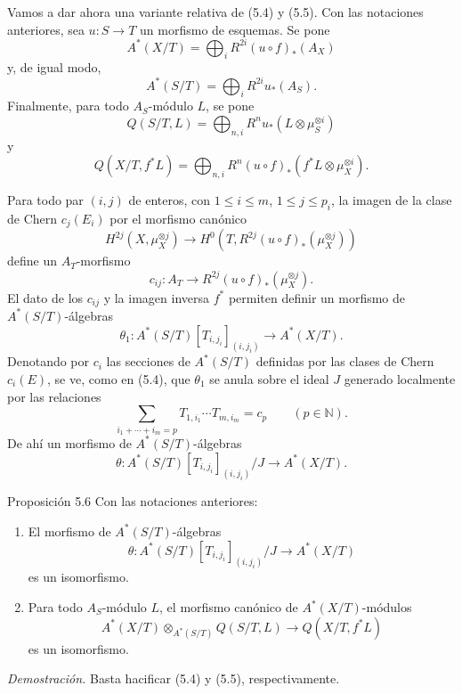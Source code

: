 Vamos a dar ahora una variante relativa de (5.4) y (5.5). Con las notaciones anteriores, sea $u:S\to T$ un morfismo de esquemas. Se pone
\[
A^*(X/T)=\bigoplus_i R^{2i}(u\circ f)_*(A_X)
\]
y, de igual modo,
\[
A^*(S/T)=\bigoplus_i R^{2i}u_*(A_S).
\]
Finalmente, para todo $A_S$-módulo $L$, se pone
\[
Q(S/T,L)=\bigoplus_{n,i}R^n u_*(L\otimes\mu_S^{\otimes i})
\]
y
\[
Q(X/T,f^*L)=\bigoplus_{n,i}R^n(u\circ f)_*(f^*L\otimes\mu_X^{\otimes i}).
\]

Para todo par $(i,j)$ de enteros, con $1\le i\le m$, $1\le j\le p_i$, la imagen de la clase de Chern $c_j(E_i)$ por el morfismo canónico
\[
H^{2j}(X,\mu_X^{\otimes j})
\to H^0(T,R^{2j}(u\circ f)_*(\mu_X^{\otimes j}))
\]
define un $A_T$-morfismo
\[
c_{ij}:A_T\to R^{2j}(u\circ f)_*(\mu_X^{\otimes j}).
\]
El dato de los $c_{ij}$ y la imagen inversa $f^*$ permiten definir un morfismo de $A^*(S/T)$-álgebras
\[
\theta_1:A^*(S/T)[T_{i,j_i}]_{(i,j_i)}\to A^*(X/T).
\]
Denotando por $c_i$ las secciones de $A^*(S/T)$ definidas por las clases de Chern $c_i(E)$, se ve, como en (5.4), que $\theta_1$ se anula sobre el ideal $J$ generado localmente por las relaciones
\[
\sum_{i_1+\cdots+i_m=p}T_{1,i_1}\cdots T_{m,i_m}=c_p\qquad(p\in\mathbb N).
\]
De ahí un morfismo de $A^*(S/T)$-álgebras
\[
\theta:A^*(S/T)[T_{i,j_i}]_{(i,j_i)}/J\to A^*(X/T).
\]

\begin{statement}{Proposición 5.6}
Con las notaciones anteriores:
\begin{enumerate}[label=\alph*)]
\item El morfismo de $A^*(S/T)$-álgebras
\[
\theta:A^*(S/T)[T_{i,j_i}]_{(i,j_i)}/J\to A^*(X/T)
\]
es un isomorfismo.
\item Para todo $A_S$-módulo $L$, el morfismo canónico de $A^*(X/T)$-módulos
\[
A^*(X/T)\otimes_{A^*(S/T)}Q(S/T,L)\to Q(X/T,f^*L)
\]
es un isomorfismo.
\end{enumerate}
\end{statement}

\emph{Demostración.} Basta hacificar (5.4) y (5.5), respectivamente.
